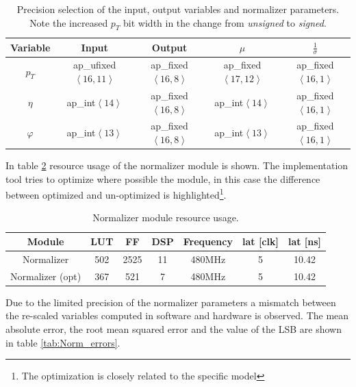 \documentclass[../../main.tex]{subfiles}
\begin{document}
\begin{center}
    \begin{table}[h]
    \centering
    \begin{tabular}{|c|c|c|c|c|}
        \hline
        Variable & Input  & Output & $\mu$ & $\frac{1}{\sigma}$  \\ 
        \hline \hline
        $p_T$ & ap\_ufixed$\left<16,11\right>$    & ap\_fixed$\left<16,8\right>$ & ap\_fixed$\left<17,12\right>$  & ap\_fixed$\left<16,1\right>$       \\
        $\eta$ & ap\_int$\left<14\right>$    & ap\_fixed$\left<16,8\right>$ & ap\_int$\left<14\right>$  & ap\_fixed$\left<16,1\right>$       \\
        $\varphi$ & ap\_int$\left<13\right>$   & ap\_fixed$\left<16,8\right>$ & ap\_int$\left<13\right>$  & ap\_fixed$\left<16,1\right>$       \\
        \hline
    \end{tabular}
    \caption{Precision selection of the input, output variables and normalizer parameters. Note the increased $p_T$ bit width in the change from \textit{unsigned} to \textit{signed}.}
    \label{tab:Norm_precision}
    \end{table}
\end{center}

In table \ref{tab:Norm_usage} resource usage of the normalizer module is shown. The implementation tool tries to optimize where possible the module, in this case the difference between optimized and un-optimized is highlighted\footnote{The optimization is closely related to the specific model}.

\begin{center}
    \begin{table}[h]
    \centering
    \begin{tabular}{|c|c|c|c|c|c|c|}
        \hline
        Module           & LUT  & FF & DSP & Frequency  & lat [clk] & lat [ns]  \\ 
        \hline \hline
        Normalizer       & 502 & 2525 & 11 & 480MHz & 5 & 10.42 \\
        Normalizer (opt) & 367 & 521  & 7  & 480MHz & 5 & 10.42 \\
        \hline
    \end{tabular}
    \caption{Normalizer module resource usage.}
    \label{tab:Norm_usage}
    \end{table}
\end{center}

Due to the limited precision of the normalizer parameters a mismatch between the re-scaled variables computed in software and hardware is observed. The mean absolute error, the root mean squared error and the value of the LSB are shown in table \ref{tab:Norm_errors}.  
\end{document}
